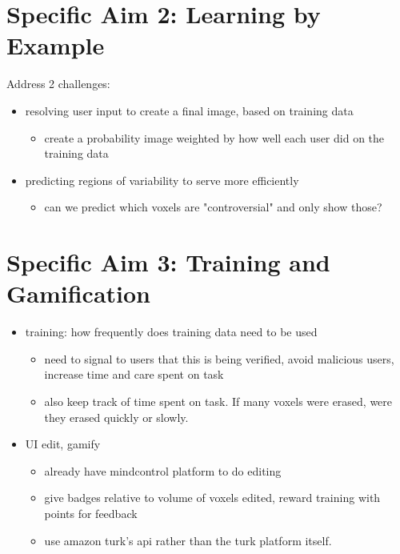 \section{Specific Aim 2: Learning by Example}

Address 2 challenges:
\begin{itemize}
\item resolving user input to create a final image, based on training data
\begin{itemize}
\item create a probability image weighted by how well each user did on the training data
\end{itemize}
\item predicting regions of variability to serve more efficiently
\begin{itemize}
\item can we predict which voxels are "controversial" and only show those?
\end{itemize}
\end{itemize}

\section{Specific Aim 3: Training and Gamification}
\begin{itemize}
\item training: how frequently does training data need to be used
\begin{itemize}
\item need to signal to users that this is being verified, avoid malicious users, increase time and care spent on task
\item also keep track of time spent on task. If many voxels were erased, were they erased quickly or slowly. 
\end{itemize}
\item UI edit, gamify
\begin{itemize}
\item already have mindcontrol platform to do editing
\item give badges relative to volume of voxels edited, reward training with points for feedback
\item use amazon turk's api rather than the turk platform itself. 
\end{itemize}
\end{itemize}